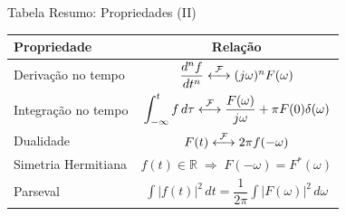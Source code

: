 
\begin{frame}{Tabela Resumo: Propriedades (II)}

\begin{table}
\small
\begin{tabular}{|l|c|}
\hline
\textbf{Propriedade} & \textbf{Relação} \\
\hline
Derivação no tempo & $\dfrac{d^n f}{dt^n} \mathrel{\overset{\mathcal{F}}{\longleftrightarrow}} (j\omega)^n F(\omega)$ \\[4pt]
\hline
Integração no tempo & $\displaystyle\int_{-\infty}^{t} f\,d\tau \mathrel{\overset{\mathcal{F}}{\longleftrightarrow}} \dfrac{F(\omega)}{j\omega} + \pi F(0)\delta(\omega)$ \\[4pt]
\hline
Dualidade & $F(t) \mathrel{\overset{\mathcal{F}}{\longleftrightarrow}} 2\pi f(-\omega)$ \\
\hline
Simetria Hermitiana & $f(t)\in\mathbb{R} \;\Rightarrow\; F(-\omega) = F^*(\omega)$ \\
\hline
Parseval & $\displaystyle\int |f(t)|^2\,dt = \dfrac{1}{2\pi}\int |F(\omega)|^2\,d\omega$ \\[4pt]
\hline
\end{tabular}
\end{table}

\end{frame}

